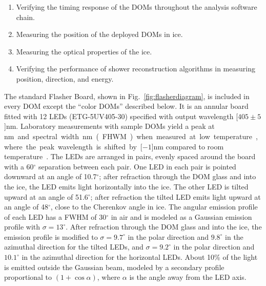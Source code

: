 \begin{enumerate}
\item Verifying the timing response of the DOMs throughout the analysis
  software chain.
\item Measuring the position of the deployed DOMs in ice.
\item Measuring the optical properties of the ice.
\item Verifying the performance of shower reconstruction algorithms
  in measuring position, direction, and energy.
\end{enumerate}

The standard Flasher Board, shown in Fig.~\ref{fig:flasherdiagram}, is
included in every DOM except the ``color DOMs''
described below. It is an annular board fitted with 12 LEDs (ETG-5UV405-30)
specified with output wavelength \unit[$405\pm5$]nm.  Laboratory
measurements with sample DOMs yield a peak at
\unit[399]nm and spectral width \unit[14]nm (FHWM) when measured at
low temperature, where the peak wavelength is shifted by
\unit[$-1$]nm compared to room temperature~\cite{Aartsen:2013rt}.
The LEDs are arranged in pairs, evenly spaced around the board
with a 60$^{\circ}$ separation between each pair. One LED in each pair
is pointed downward at an angle of 10.7$^{\circ}$; after refraction through the DOM glass and into
the ice, the LED
emits light horizontally into the ice. The other LED is tilted upward
at an angle of 51.6$^{\circ}$; after refraction the tilted LED
emits light upward at an angle 
of 48$^{\circ}$, close to the Cherenkov angle in ice.
The angular emission profile of each LED has a FWHM of
30$^{\circ}$ in air and is modeled as a Gaussian emission profile
with $\sigma = 13^{\circ}$. After refraction through the DOM glass and into
the ice, the emission profile is modified to $\sigma = 9.7^{\circ}$ in the polar direction
and $9.8^{\circ}$ in the azimuthal direction for the tilted LEDs, and $\sigma=9.2^{\circ}$ in the polar direction
and $10.1^{\circ}$ in the azimuthal direction for the horizontal LEDs.
About 10\% of the light is emitted outside the Gaussian beam, modeled by
a secondary profile proportional to $(1+\cos{\alpha})$, where $\alpha$ is the angle
away from the LED axis.

